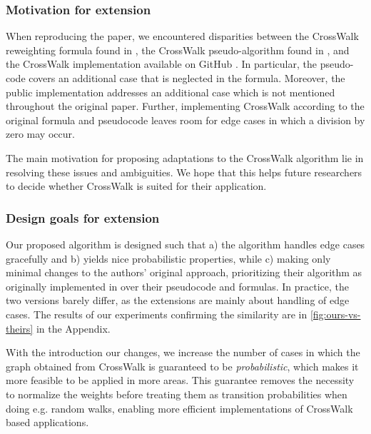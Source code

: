 \subsubsection*{Motivation for extension}
\label{sec:motivation}

When reproducing the paper, we encountered disparities between the CrossWalk reweighting formula found in \cite[Equation~4]{Khajehnejad2022}, the CrossWalk pseudo-algorithm found in \cite[Algorithm~1]{Khajehnejad2022}, and the CrossWalk implementation available on GitHub \citep{Khajehnejad2022-github}. 
In particular, the pseudo-code covers an additional case that is neglected in the formula. Moreover, the public implementation addresses an additional case which is not mentioned throughout the original paper. Further, implementing CrossWalk according to the original formula and pseudocode leaves room for edge cases in which a division by zero may occur.

The main motivation for proposing adaptations to the CrossWalk algorithm lie in resolving these issues and ambiguities. We hope that this helps future researchers to decide whether CrossWalk is suited for their application.

\subsubsection*{Design goals for extension}
Our proposed algorithm is designed such that a) the algorithm handles edge cases gracefully and b) yields nice probabilistic properties, while c) making only minimal changes to the authors' original approach, prioritizing their algorithm as originally implemented in \citep{Khajehnejad2022-github} over their pseudocode and formulas. In practice, the two versions barely differ, as the extensions are mainly about handling of edge cases. The results of our experiments confirming the similarity are in \autoref{fig:ours-vs-theirs} in the Appendix.

With the introduction our changes, we increase the number of cases in which the graph obtained from CrossWalk is guaranteed to be \textit{probabilistic}, which makes it more feasible to be applied in more areas. This guarantee removes the necessity to normalize the weights before treating them as transition probabilities when doing e.g. random walks, enabling more efficient implementations of CrossWalk based applications.

